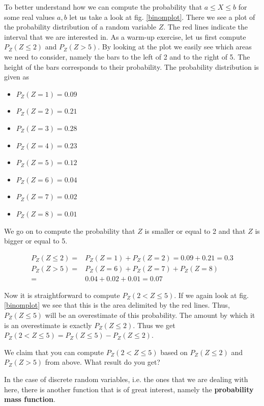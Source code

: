 \documentclass[a4paper,11pt,leqno]{report}
\begin{document}
To better understand how we can compute the probability that $ a \leq X \leq b $ for some real values $ a,b $ let us take a 
look at fig. \ref{binomplot}. There we see a plot of the probability distribution of a random variable $ Z $. The red lines
indicate the interval that we are interested in. As a warm-up exercise, let us first compute $ P_{Z}(Z \leq 2) $ and 
$ P_{Z}(Z > 5) $. By looking at the plot we easily see which areas we need to consider, namely the bars to the left of 2
and to the right of 5. The height of the bars corresponds to their probability. The probability distribution is given as
\begin{itemize}
\item $ P_{Z}(Z = 1) = 0.09 $
\item $ P_{Z}(Z = 2) = 0.21 $
\item $ P_{Z}(Z = 3) = 0.28 $
\item $ P_{Z}(Z = 4) = 0.23 $
\item $ P_{Z}(Z = 5) = 0.12 $
\item $ P_{Z}(Z = 6) = 0.04 $
\item $ P_{Z}(Z = 7) = 0.02 $
\item $ P_{Z}(Z = 8) = 0.01 $
\end{itemize}

We go on to compute the probability that $ Z $ is smaller or equal to 2 and that $ Z $ is bigger or equal to 5.

\begin{align}
P_{Z}(Z \leq 2) =& P_{Z}(Z=1) + P_{Z}(Z=2) = 0.09 + 0.21 = 0.3 \\
P_{Z}(Z > 5) =& P_{Z}(Z=6) + P_{Z}(Z=7) + P_{Z}(Z=8) \\ 
=& 0.04 + 0.02 + 0.01 = 0.07 \nonumber
\end{align} 

Now it is straightforward to compute $ P_{Z}(2 < Z \leq 5) $. If we again look at fig. \ref{binomplot} we see that this is
the area delimited by the red lines. Thus, $ P_{Z}(Z \leq 5) $ will be an overestimate of this probability. The amount by
which it is an overestimate is exactly $ P_{Z}(Z \leq 2) $. Thus we get $ P_{Z}(2 < Z \leq 5) = P_{Z}(Z \leq 5) - P_{Z}(Z \leq 2) $.

\begin{Exercise}
We claim that you can compute $ P_{Z}(2 < Z \leq 5) $ based on $ P_{Z}(Z \leq 2) $ and $ P_{Z}(Z > 5) $ from above. What result do
you get?
\end{Exercise}

In the case of discrete random variables, i.e. the ones that we are dealing with here, there is another function that is of great 
interest, namely the \textbf{probability mass function}.
\end{document}
